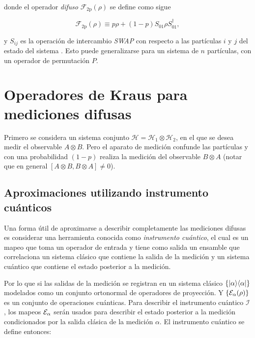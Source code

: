 donde el operador \textit{difuso } $\mathcal{F}_{\text{2p}}(\rho)$ se define como sigue 

\begin{equation}\label{operador_difuso}
    \mathcal{F}_{\text{2p}}(\rho)\equiv p\rho+(1-p)S_{01}\rho S_{01}^\dagger,
\end{equation}

 y  $S_{ij}$ es la operación de intercambio \textit{SWAP} con respecto a las partículas $i$ y $j$ del estado del sistema {\cite{Pineda_2021}}. Esto puede generalizarse para un sistema de $n$ partículas, con un operador de permutación $P$.%

 \section{Operadores de Kraus para mediciones difusas}

 Primero se considera un sistema conjunto $\mathcal{H}=\mathcal{H}_1\otimes \mathcal{H}_2$, en el que se desea medir el observable $A\otimes B$. Pero el aparato de medición confunde las partículas y con una probabilidad $(1-p) $ realiza la medición del observable $B\otimes A$ (notar que en general $[A\otimes B,B\otimes A]\ne 0$). 

   
\subsection{Aproximaciones utilizando instrumento cuánticos}

Una forma útil de aproximarse a describir completamente las mediciones difusas es considerar una herramienta conocida como \textit{instrumento cuántico}, el cual es un mapeo que toma un operador de entrada y tiene como salida un ensamble que correlaciona un sistema clásico que contiene la salida de la medición y un sistema cuántico que contiene el estado posterior a la medición. 


Por lo que si las salidas de la medición se registran en un sistema clásico $\{|\alpha\rangle \langle \alpha |\}$ modelados como un conjunto ortonormal de operadores de proyección. Y $\{\mathcal{E}_\alpha(\rho)\}$ es un conjunto de operaciones cuánticas. Para describir el instrumento cuántico $\mathcal{I}$, los mapeos $\mathcal{E}_\alpha$ serán usados para describir  el estado posterior a la medición condicionados por la salida clásica de la medición $\alpha$. El instrumento cuántico se define entonces:

